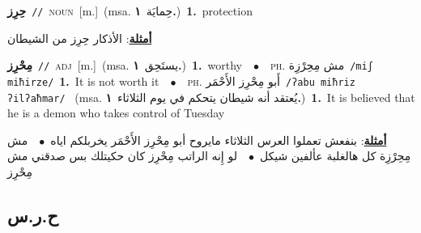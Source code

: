 \documentclass[10pt,a4paper,twoside]{article} %
\begin{document}
\begin{multicols}{2}
{\setlength\topsep{0pt}\textbf{\foreignlanguage{arabic}{حِرِز}}\ {\color{gray}\texttt{//}\color{black}}\ \textsc{noun}\ [m.]\ \color{gray}(msa. \foreignlanguage{arabic}{حِمايَة}~\foreignlanguage{arabic}{\textbf{١.}})\color{black}\ \textbf{1.}~protection\  \begin{flushright}\color{gray}\foreignlanguage{arabic}{\textbf{\underline{\foreignlanguage{arabic}{أمثلة}}}: الأذكار حِرِز من الشيطان}\end{flushright}\color{black}} \vspace{2mm}

{\setlength\topsep{0pt}\textbf{\foreignlanguage{arabic}{مِحْرِز}}\ {\color{gray}\texttt{//}\color{black}}\ \textsc{adj}\ [m.]\ \color{gray}(msa. \foreignlanguage{arabic}{يستَحِق}~\foreignlanguage{arabic}{\textbf{١.}})\color{black}\ \textbf{1.}~worthy\ \ $\bullet$\ \ \textsc{ph.} \color{gray} \foreignlanguage{arabic}{مش مِحِرْزِة}\color{black}\ {\color{gray}\texttt{/{\sffamily miʃ miħirze}/}\color{black}}\ \textbf{1.}~It is not worth it\ \ $\bullet$\ \ \textsc{ph.} \color{gray} \foreignlanguage{arabic}{أَبو مِحْرِز الأَحْمَر}\color{black}\ {\color{gray}\texttt{/{\sffamily ʔabu miħriz ʔilʔaħmar}/}\color{black}}\ \color{gray} (msa. \foreignlanguage{arabic}{يُعتقد أنه شيطان يتحكم في يوم الثلاثاء}~\foreignlanguage{arabic}{\textbf{١.}})\color{black}\ \textbf{1.}~It is believed that he is a demon who takes control of Tuesday\  \begin{flushright}\color{gray}\foreignlanguage{arabic}{\textbf{\underline{\foreignlanguage{arabic}{أمثلة}}}: بنفعش تعملوا العرس الثلاثاء مايروح أبو مِحْرِز الأَحْمَر يخربلكم اياه\ $\bullet$\ \  مش مِحِرْزِة كل هالغلبة عألفين شيكل\ $\bullet$\ \  لو إِنه الراتب مِحْرِز كان حكيتلك بس صدقني مش مِحْرِز}\end{flushright}\color{black}} \vspace{2mm}

\vspace{-3mm}
\subsection*{\color{blue}\foreignlanguage{arabic}{ح.ر.س}\color{blue}{}} 


\end{multicols}
\end{document}
